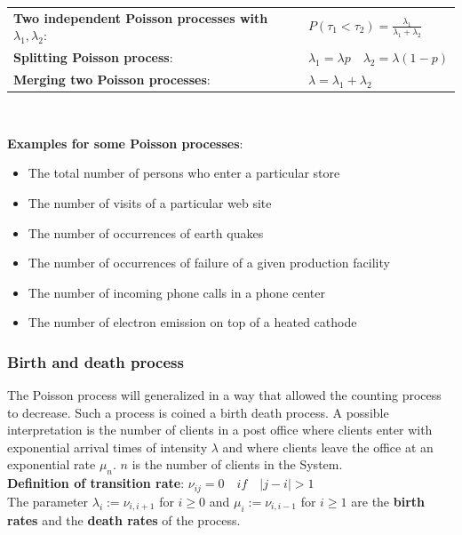\renewcommand{\arraystretch}{2}
\begin{tabular}{|l|l|}
	\hline
	\textbf{Two independent Poisson processes with $\lambda_1,\lambda_2$}: & $P(\tau_1 < \tau_2)=\displaystyle\frac{\lambda_1}{\lambda_1+\lambda_2}$ \\
	\textbf{Splitting Poisson process}: & $\lambda_1 = \lambda p \quad \lambda_2 = \lambda (1-p)$\\
	\textbf{Merging two Poisson processes}: & $\lambda = \lambda_1 + \lambda_2$\\
	\hline
\end{tabular}\\
\renewcommand{\arraystretch}{1.0}

\textbf{Examples for some Poisson processes}: 
\begin{itemize}
	\item The total number of persons who enter a particular store
	\item The number of visits of a particular web site
	\item The number of occurrences of earth quakes
	\item The number of occurrences of failure of a given production facility
	\item The number of incoming phone calls in a phone center
	\item The number of electron emission on top of a heated cathode
\end{itemize}

\subsubsection{Birth and death process }

The Poisson process will generalized in a way that allowed the counting process to decrease. Such a process is coined a birth death process. A possible interpretation is the number of clients in a post office where clients enter with exponential arrival times of intensity $\lambda$ and where clients leave the office at an exponential rate $\mu_n$. $n$ is the number of clients in the System.\\

\textbf{Definition of transition rate}: $\nu_{ij}=0 \quad if\quad |j-i|>1$\\

The parameter $\lambda_i:=\nu_{i,i+1}$ for $i\geq 0$ and $\mu_i:=\nu_{i,i-1}$ for $i\geq 1$ are the \textbf{birth rates} and the \textbf{death rates} of the process.\\

